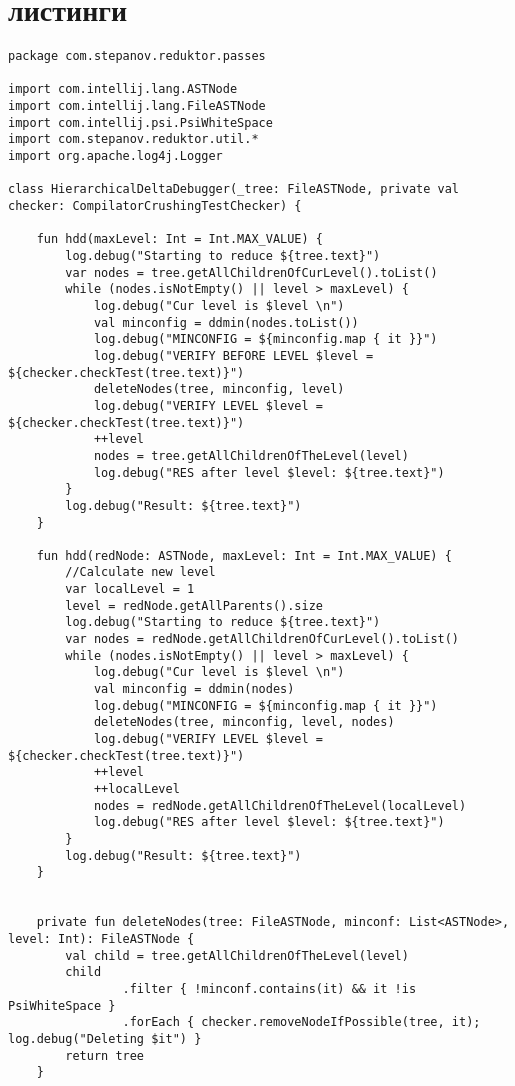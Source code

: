 \chapter{листинги}
\begin{lstlisting}[caption = Исходный код файла HierarchialDeltaDebugger.kt]
package com.stepanov.reduktor.passes

import com.intellij.lang.ASTNode
import com.intellij.lang.FileASTNode
import com.intellij.psi.PsiWhiteSpace
import com.stepanov.reduktor.util.*
import org.apache.log4j.Logger

class HierarchicalDeltaDebugger(_tree: FileASTNode, private val checker: CompilatorCrushingTestChecker) {

    fun hdd(maxLevel: Int = Int.MAX_VALUE) {
        log.debug("Starting to reduce ${tree.text}")
        var nodes = tree.getAllChildrenOfCurLevel().toList()
        while (nodes.isNotEmpty() || level > maxLevel) {
            log.debug("Cur level is $level \n")
            val minconfig = ddmin(nodes.toList())
            log.debug("MINCONFIG = ${minconfig.map { it }}")
            log.debug("VERIFY BEFORE LEVEL $level = ${checker.checkTest(tree.text)}")
            deleteNodes(tree, minconfig, level)
            log.debug("VERIFY LEVEL $level = ${checker.checkTest(tree.text)}")
            ++level
            nodes = tree.getAllChildrenOfTheLevel(level)
            log.debug("RES after level $level: ${tree.text}")
        }
        log.debug("Result: ${tree.text}")
    }

    fun hdd(redNode: ASTNode, maxLevel: Int = Int.MAX_VALUE) {
        //Calculate new level
        var localLevel = 1
        level = redNode.getAllParents().size
        log.debug("Starting to reduce ${tree.text}")
        var nodes = redNode.getAllChildrenOfCurLevel().toList()
        while (nodes.isNotEmpty() || level > maxLevel) {
            log.debug("Cur level is $level \n")
            val minconfig = ddmin(nodes)
            log.debug("MINCONFIG = ${minconfig.map { it }}")
            deleteNodes(tree, minconfig, level, nodes)
            log.debug("VERIFY LEVEL $level = ${checker.checkTest(tree.text)}")
            ++level
            ++localLevel
            nodes = redNode.getAllChildrenOfTheLevel(localLevel)
            log.debug("RES after level $level: ${tree.text}")
        }
        log.debug("Result: ${tree.text}")
    }


    private fun deleteNodes(tree: FileASTNode, minconf: List<ASTNode>, level: Int): FileASTNode {
        val child = tree.getAllChildrenOfTheLevel(level)
        child
                .filter { !minconf.contains(it) && it !is PsiWhiteSpace }
                .forEach { checker.removeNodeIfPossible(tree, it); log.debug("Deleting $it") }
        return tree
    }


\end{lstlisting}
